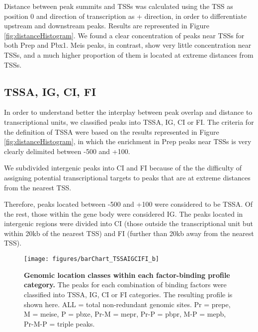 Distance between peak summits and \acp{TSS} was calculated using the \ac{TSS} as position 0 and direction of transcription as + direction, in order to differentiate upstream and downstream peaks. Results are represented in Figure \ref{fig:distanceHistogram}. We found a clear concentration of peaks near \ac{TSS}s for both Prep and Pbx1. Meis peaks, in contrast, show very little concentration near \acp{TSS}, and a much higher proportion of them is located at extreme distances from \acp{TSS}. %

\subsection{TSSA, IG, CI, FI}

In order to understand better the interplay between peak overlap and distance to transcriptional units, we classified peaks into \ac{TSSA}, \ac{IG}, \ac{CI} or \ac{FI}. The criteria for the definition of \ac{TSSA} were based on the  results represented in Figure \ref{fig:distanceHistogram}, in which the enrichment in Prep peaks near \acp{TSS} is very clearly delimited between -500 and +100. 

We subdivided intergenic peaks into \ac{CI} and \ac{FI} because of the the difficulty of assigning potential transcriptional targets to peaks that are at extreme distances from the nearest \ac{TSS}.%

Therefore, peaks located between -500 and +100 were considered to be \ac{TSSA}. Of the rest, those within the gene body were considered \ac{IG}. The peaks located in intergenic regions were divided into \ac{CI} (those outside the transcriptional unit but within 20kb of the nearest \ac{TSS}) and \ac{FI} (further than 20kb away from the nearest \ac{TSS}). 

\begin{figure}[]
  \centering
  \texttt{[image: figures/barChart\_TSSAIGCIFI\_b]}
  \caption[Genomic location classes within each factor-binding profile category]{\textbf{Genomic location classes within each factor-binding profile category.} The peaks for each combination of binding factors were classified into \ac{TSSA}, \ac{IG}, \ac{CI} or \ac{FI} categories. The resulting profile is shown here. ALL = total non-redundant genomic sites. Pr = \ac{prepe}, M = \ac{meise}, P = \ac{pbxe}, Pr-M = \ac{mepr}, Pr-P = \ac{pbpr}, M-P = \ac{mepb}, Pr-M-P = triple peaks.}
  \label{fig:distanceBarChart}
\end{figure}

